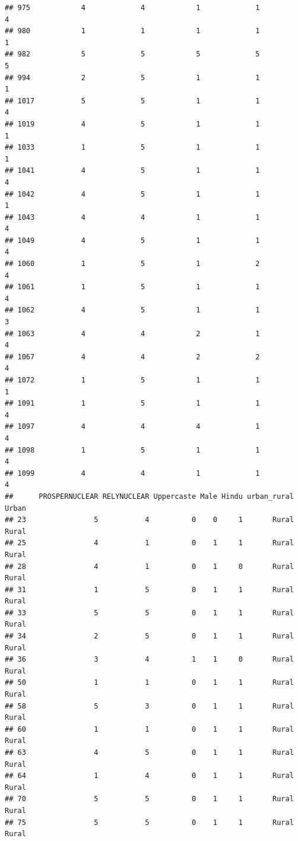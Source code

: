\documentclass[
]{article}
\begin{document}
\begin{verbatim}
## 975            4             4            1             1          4
## 980            1             1            1             1          1
## 982            5             5            5             5          5
## 994            2             5            1             1          1
## 1017           5             5            1             1          4
## 1019           4             5            1             1          1
## 1033           1             5            1             1          1
## 1041           4             5            1             1          4
## 1042           4             5            1             1          1
## 1043           4             4            1             1          4
## 1049           4             5            1             1          4
## 1060           1             5            1             2          4
## 1061           1             5            1             1          4
## 1062           4             5            1             1          3
## 1063           4             4            2             1          4
## 1067           4             4            2             2          4
## 1072           1             5            1             1          1
## 1091           1             5            1             1          4
## 1097           4             4            4             1          4
## 1098           1             5            1             1          4
## 1099           4             4            1             1          4
##      PROSPERNUCLEAR RELYNUCLEAR Uppercaste Male Hindu urban_rural Urban
## 23                5           4          0    0     1       Rural Rural
## 25                4           1          0    1     1       Rural Rural
## 28                4           1          0    1     0       Rural Rural
## 31                1           5          0    1     1       Rural Rural
## 33                5           5          0    1     1       Rural Rural
## 34                2           5          0    1     1       Rural Rural
## 36                3           4          1    1     0       Rural Rural
## 50                1           1          0    1     1       Rural Rural
## 58                5           3          0    1     1       Rural Rural
## 60                1           1          0    1     1       Rural Rural
## 63                4           5          0    1     1       Rural Rural
## 64                1           4          0    1     1       Rural Rural
## 70                5           5          0    1     1       Rural Rural
## 75                5           5          0    1     1       Rural Rural

\end{verbatim}
\end{document}
